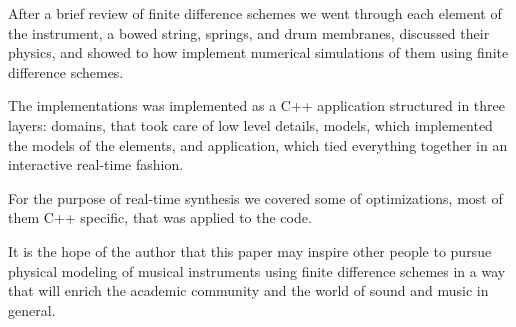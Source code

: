 \documentclass{article}
\begin{document}
After a brief review of finite difference schemes we went through each element of the instrument, a bowed string, springs, and drum membranes, discussed their physics, and showed to how implement numerical simulations of them using finite difference schemes.

The implementations was implemented as a C++ application structured in three layers: domains, that took care of low level details, models, which implemented the models of the elements, and application, which tied everything together in an interactive real-time fashion.

For the purpose of real-time synthesis we covered some of optimizations, most of them C++ specific, that was applied to the code.

It is the hope of the author that this paper may inspire other people to pursue physical modeling of musical instruments using finite difference schemes in a way that will enrich the academic community and the world of sound and music in general.


\end{document}

